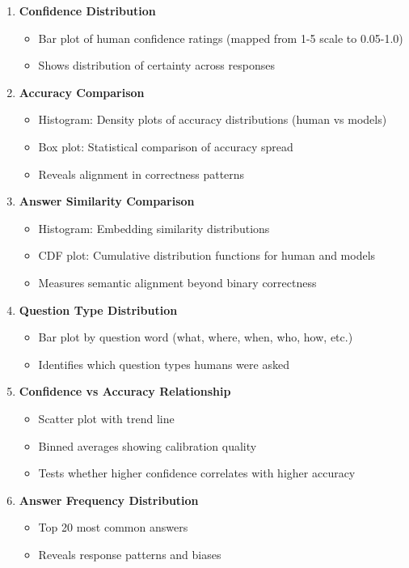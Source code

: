 \documentclass{article}
\begin{document}
\begin{enumerate}
    \item \textbf{Confidence Distribution}
    \begin{itemize}
        \item Bar plot of human confidence ratings (mapped from 1-5 scale to 0.05-1.0)
        \item Shows distribution of certainty across responses
    \end{itemize}

    \item \textbf{Accuracy Comparison}
    \begin{itemize}
        \item Histogram: Density plots of accuracy distributions (human vs models)
        \item Box plot: Statistical comparison of accuracy spread
        \item Reveals alignment in correctness patterns
    \end{itemize}

    \item \textbf{Answer Similarity Comparison}
    \begin{itemize}
        \item Histogram: Embedding similarity distributions
        \item CDF plot: Cumulative distribution functions for human and models
        \item Measures semantic alignment beyond binary correctness
    \end{itemize}

    \item \textbf{Question Type Distribution}
    \begin{itemize}
        \item Bar plot by question word (what, where, when, who, how, etc.)
        \item Identifies which question types humans were asked
    \end{itemize}

    \item \textbf{Confidence vs Accuracy Relationship}
    \begin{itemize}
        \item Scatter plot with trend line
        \item Binned averages showing calibration quality
        \item Tests whether higher confidence correlates with higher accuracy
    \end{itemize}

    \item \textbf{Answer Frequency Distribution}
    \begin{itemize}
        \item Top 20 most common answers
        \item Reveals response patterns and biases
    \end{itemize}
\end{enumerate}
\end{document}
